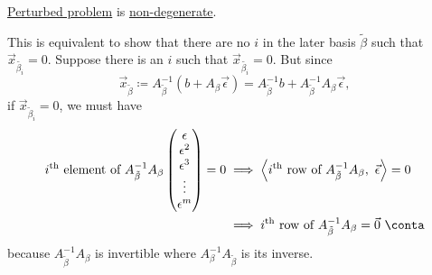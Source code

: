 \begin{answer}
	\begin{claim}
		\hyperref[def:perturbed-problem]{Perturbed problem} is \hyperref[conj:non-degeneracy-hypothesis]{non-degenerate}.
	\end{claim}
	\begin{explanation}
		This is equivalent to show that there are no \(i\) in the later basis \(\tilde{\beta}\) such that \(\vec{x}_{\tilde{\beta_i}} = 0\). Suppose there is an \(i\) such that
		\(\vec{x}_{\tilde{\beta_i}} = 0\). But since
		\[
			\vec{x}_{\tilde{\beta}} \coloneqq A^{-1}_{\tilde{\beta}}(b + A_{\beta}\vec{\epsilon}) = A^{-1}_{\tilde{\beta}}b + A^{-1}_{\tilde{\beta}}A_{\beta}\vec{\epsilon},
		\]
		if \(\vec{x} _{\widetilde{\beta}_i} = 0\), we must have
		\[
			\begin{split}
				i^{\text{th}} \text{ element of }A^{-1}_{\tilde{\beta}}A_{\beta}\begin{pmatrix}
					\epsilon   \\
					\epsilon^2 \\
					\epsilon^3 \\
					\vdots     \\
					\epsilon^m \\
				\end{pmatrix} = 0
				&\implies \left< i^{\text{th}} \text{ row of } A^{-1}_{\tilde{\beta}}A_{\beta},\ \vec{\epsilon} \right> = 0\\
				&\implies i^{\text{th}} \text{ row of } A^{-1}_{\tilde{\beta}}A_{\beta} = \vec{0}\ \conta
			\end{split}
		\]
		because \(A^{-1}_{\tilde{\beta}}A_{\beta}\) is invertible where \(A^{-1}_{\beta}A_{\tilde{\beta}}\) is its inverse.
	\end{explanation}
\end{answer}